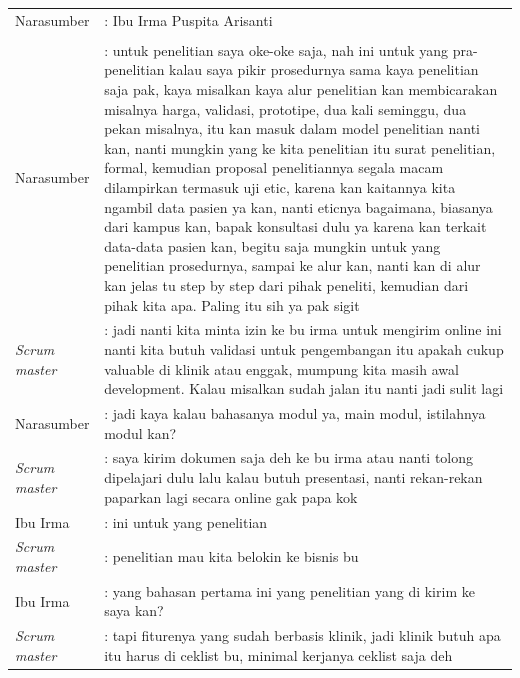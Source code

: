 \begin{table}[h!]
	\centering
\begin{center}
		
\begin{tabular}{ p{2.8cm} p{11cm}}
	
Narasumber & : Ibu Irma Puspita Arisanti\\

&\\
			
Narasumber & : untuk penelitian saya oke-oke saja, nah ini untuk yang pra-penelitian kalau saya pikir prosedurnya sama kaya penelitian saja pak, kaya misalkan kaya alur penelitian kan membicarakan misalnya harga, validasi, prototipe, dua kali seminggu, dua pekan misalnya, itu kan masuk dalam model penelitian nanti kan, nanti mungkin yang ke kita penelitian itu surat penelitian, formal, kemudian proposal penelitiannya segala macam dilampirkan termasuk uji etic, karena kan kaitannya kita ngambil data pasien ya kan, nanti eticnya bagaimana, biasanya dari kampus kan, bapak konsultasi dulu ya karena kan terkait data-data pasien kan, begitu saja mungkin untuk yang penelitian prosedurnya, sampai ke alur kan, nanti kan di alur kan jelas tu step by step dari pihak peneliti, kemudian dari pihak kita apa. Paling itu sih ya pak sigit\\

\emph{Scrum master} & : jadi nanti kita minta izin ke bu irma untuk mengirim online ini nanti kita butuh validasi untuk pengembangan itu apakah cukup valuable di klinik atau enggak, mumpung kita masih awal development. Kalau misalkan sudah jalan itu nanti jadi sulit lagi\\

Narasumber & : jadi kaya kalau bahasanya modul ya, main modul, istilahnya modul kan?\\

\emph{Scrum master} & : saya kirim dokumen saja deh ke bu irma atau  nanti tolong dipelajari dulu lalu kalau butuh presentasi, nanti rekan-rekan paparkan lagi secara online gak papa kok\\

Ibu Irma & : ini untuk yang penelitian\\

\emph{Scrum master} & : penelitian mau kita belokin ke bisnis bu\\

Ibu Irma & : yang bahasan pertama ini yang penelitian yang di kirim ke saya kan?\\

\emph{Scrum master} & : tapi fiturenya yang sudah berbasis klinik, jadi klinik butuh apa itu harus di ceklist bu, minimal kerjanya ceklist saja deh\\
			
\end{tabular}
		
\end{center}
\end{table}

